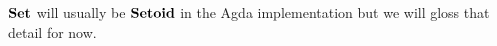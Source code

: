 \documentclass[acmsmall,screen]{acmart}
\begin{document}
\noindent $\mathbf{Set}$ will usually be $\mathbf{Setoid}$ in the Agda implementation but we will gloss that detail for now.















\end{document}
